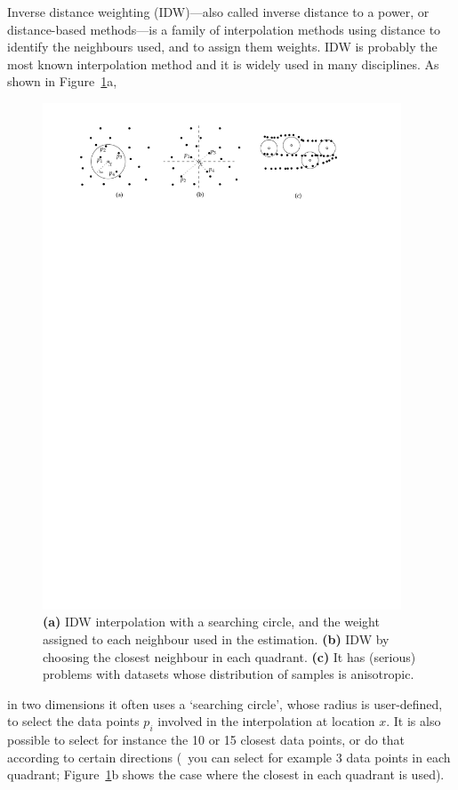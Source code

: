 Inverse distance weighting (IDW)---also called inverse distance to a power, or distance-based methods---is a family of interpolation methods using distance to identify the neighbours used, and to assign them weights.
IDW is probably the most known interpolation method and it is widely used in many disciplines.
As shown in Figure~\ref{fig:idw}a,
\begin{figure}
  \centering
  \includegraphics[width=0.95\textwidth]{figs/idw}
  \caption{\textbf{(a)} IDW interpolation with a searching circle, and the weight assigned to each neighbour used in the estimation. \textbf{(b)} IDW by choosing the closest neighbour in each quadrant. \textbf{(c)} It has (serious) problems with datasets whose distribution of samples is anisotropic.} 
\label{fig:idw}
\end{figure}
in two dimensions it often uses a `searching circle', whose radius is user-defined, to select the data points $p_i$ involved in the interpolation at location $x$. 
It is also possible to select for instance the 10 or 15 closest data points, or do that according to certain directions (\ie\ you can select for example 3 data points in each quadrant; Figure~\ref{fig:idw}b shows the case where the closest in each quadrant is used). 

